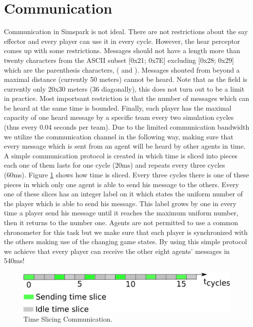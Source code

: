 \section{Communication}
Communication in Simspark is not ideal. There are not restrictions about the say effector and every player can use it in every cycle. However, the hear perceptor comes up with some restrictions. Messages should not have a length more than twenty characters from the ASCII subset [0x21; 0x7E] excluding [0x28; 0x29] which are the parenthesis characters, ( and ). Messages shouted from beyond a maximal distance (currently 50 meters) cannot be heard. Note that as the field is currently only 20x30 meters (36 diagonally), this does not turn out to be a limit in practice. Most importsant restriction is that the number of messages which can be heard at the same time is bounded. Finally, each player has the maximal capacity of one heard message by a specific team every two simulation cycles (thus every 0.04 seconds per team). Due to the limited communication bandwidth we utilize the communication channel in the following way, making sure that every message which is sent from an agent will be heard by other agents in time. A simple communication protocol is created in which time is sliced into pieces each one of them lasts for one cycle (20ms) and repeats every three cycles (60ms). Figure \ref{fig:TimeSlicing} shows how time is sliced. Every three cycles there is one of these pieces in which only one agent is able to send his message to the others. Every one of these slices has an integer label on it which states the uniform number of the player which is able to send his message. This label grows by one in every time a player send his message until it reaches the maximum uniform number, then it returns to the number one. Agents are not permitted to use a common chronometer for this task but we make sure that each player is synchronized with the others making use of the changing game states. By using this simple protocol we achieve that every player can receive the other eight agents' messages in 540ms!
\begin{figure}[!h]
\centering
  \includegraphics[scale=0.7]{Chapter3/figures/MAC.pdf}  
  \caption{Time Slicing Communication.}
  \label{fig:TimeSlicing}
\end{figure} 